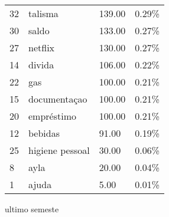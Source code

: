 \documentclass[
  8pt,
  a4paper,
  DIV=11,
  numbers=noendperiod]{scrartcl}
\begin{document}
\begin{longtable}[]{@{}llll@{}}
32 & talisma & 139.00 & 0.29\% \\
30 & saldo & 133.00 & 0.27\% \\
27 & netflix & 130.00 & 0.27\% \\
14 & divida & 106.00 & 0.22\% \\
22 & gas & 100.00 & 0.21\% \\
15 & documentaçao & 100.00 & 0.21\% \\
20 & empréstimo & 100.00 & 0.21\% \\
12 & bebidas & 91.00 & 0.19\% \\
25 & higiene pessoal & 30.00 & 0.06\% \\
8 & ayla & 20.00 & 0.04\% \\
1 & ajuda & 5.00 & 0.01\% \\
\end{longtable}

ultimo semeste
\end{document}
